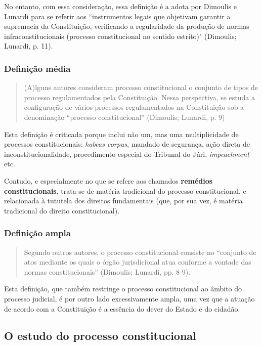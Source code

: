 \documentclass{article}
\begin{document}
No entanto, com essa consideração, essa definição é a adota por Dimoulis e Lunardi para se referir aos ``instrumentos legais que objetivam garantir a supremacia da Constituição, verificando a regularidade da produção de normas infraconstitucionais (processo constitucional no sentido estrito)" (Dimoulis; Lunardi, p. 11).

\subsubsection{Definição média}

\begin{quote}
    (A)lguns autores consideram processo constitucional o conjunto de tipos de processo regulamentados pela Constituição. Nessa perspectiva, se estuda a configuração de vários processos regulamentados na Constituição sob a denominação “processo constitucional” (Dimoulis; Lunardi, p. 9)
\end{quote}

Esta definição é criticada porque inclui não um, mas uma multiplicidade de processos constitucionais: \textit{habeas corpus}, mandado de segurança, ação direta de inconstitucionalidade, procedimento especial do Tribunal do Júri, \textit{impeachment} etc.

Contudo, e especialmente no que se refere aos chamados \textbf{remédios constitucionais}, trata-se de matéria tradicional do processo constitucional, e relacionada à tututela dos direitos fundamentais (que, por sua vez, é matéria tradicional do direito constitucional).

\subsubsection{Definição ampla}

\begin{quote}
    Segundo outros autores, o processo constitucional consiste no “conjunto de atos mediante os quais o órgão jurisdicional atua conforme a vontade das normas constitucionais” (Dimoulis; Lunardi, pp. 8-9).
\end{quote}

Esta definição, que também restringe o processo constitucional ao âmbito do processo judicial, é por outro lado excessivamente ampla, uma vez que a atuação de acordo com a Constituição é a essência do dever do Estado e do cidadão.

\subsection{O estudo do processo constitucional}
\end{document}
